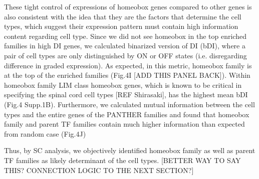 These tight control of expressions of homeobox genes compared to other genes is also consistent with the idea that they are the factors that determine the cell types, which suggest their expression pattern must contain high information content regarding cell type. Since we did not see homeobox in the top enriched families in high DI genes, we calculated binarized version of DI (bDI), where a pair of cell types are only distinguished by ON or OFF states (i.e. disregarding difference in graded expression). As expected, in this metric, homeobox family is at the top of the enriched families (Fig.4I [ADD THIS PANEL BACK]). Within homeobox family LIM class homeobox genes, which is known to be critical in specifying the spinal cord cell types [REF Shirasaki], has the highest mean bDI (Fig.4 Supp.1B).  Furthermore, we calculated mutual information between the cell types and the entire genes of the PANTHER families and found that homeobox family and parent TF families contain much higher information than expected from random case (Fig.4J)

Thus, by SC analysis, we objectively identified homeobox family as well as parent TF families as likely determinant of the cell types. [BETTER WAY TO SAY THIS? CONNECTION LOGIC TO THE NEXT SECTION?]
